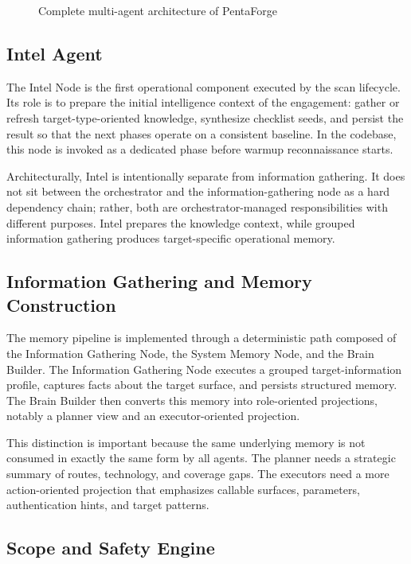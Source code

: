 \documentclass[12pt,a4paper]{report}
\begin{document}
\begin{figure}[H]
    \centering
    \caption{Complete multi-agent architecture of PentaForge}
    \label{fig:multi_agent}
\end{figure}

\subsection{Intel Agent}

The Intel Node is the first operational component executed by the scan lifecycle.
Its role is to prepare the initial intelligence context of the engagement: gather or
refresh target-type-oriented knowledge, synthesize checklist seeds, and persist the
result so that the next phases operate on a consistent baseline. In the codebase,
this node is invoked as a dedicated phase before warmup reconnaissance starts.

Architecturally, Intel is intentionally separate from information gathering. It does
not sit between the orchestrator and the information-gathering node as a hard
dependency chain; rather, both are orchestrator-managed responsibilities with
different purposes. Intel prepares the knowledge context, while grouped information
gathering produces target-specific operational memory.

\subsection{Information Gathering and Memory Construction}

The memory pipeline is implemented through a deterministic path composed of the
Information Gathering Node, the System Memory Node, and the Brain Builder. The
Information Gathering Node executes a grouped target-information profile, captures
facts about the target surface, and persists structured memory. The Brain Builder
then converts this memory into role-oriented projections, notably a planner view and
an executor-oriented projection.

This distinction is important because the same underlying memory is not consumed in
exactly the same form by all agents. The planner needs a strategic summary of routes,
technology, and coverage gaps. The executors need a more action-oriented projection
that emphasizes callable surfaces, parameters, authentication hints, and target
patterns.

\subsection{Scope and Safety Engine}
\end{document}
